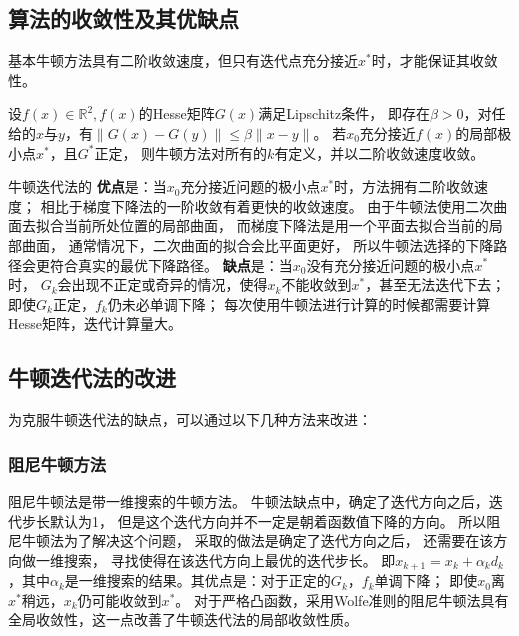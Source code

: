 \subsection{算法的收敛性及其优缺点}
    基本牛顿方法具有二阶收敛速度，但只有迭代点充分接近$x^*$时，才能保证其收敛性。
    
\begin{theorem}\label{thm2_1}
    设$f(x) \in \mathbb{R}^2, f(x)$的Hesse矩阵$G(x)$满足Lipschitz条件，
    即存在$\beta>0$，对任给的$x$与$y$，有$\|G(x)-G(y)\|\leq\beta\|x-y\|$。
    若$x_0$充分接近$f(x)$的局部极小点$x^*$，且$G^*$正定，
    则牛顿方法对所有的$k$有定义，并以二阶收敛速度收敛。
\end{theorem}
    
    牛顿迭代法的
    \textbf{优点}是：当$x_0$充分接近问题的极小点$x^*$时，方法拥有二阶收敛速度；
    相比于梯度下降法的一阶收敛有着更快的收敛速度。
    由于牛顿法使用二次曲面去拟合当前所处位置的局部曲面，
    而梯度下降法是用一个平面去拟合当前的局部曲面，
    通常情况下，二次曲面的拟合会比平面更好，
    所以牛顿法选择的下降路径会更符合真实的最优下降路径。
    \textbf{缺点}是：当$x_0$没有充分接近问题的极小点$x^*$时，
    $G_k$会出现不正定或奇异的情况，使得${x_k}$不能收敛到$x^*$，甚至无法迭代下去；
    即使$G_k$正定，${f_k}$仍未必单调下降；
    每次使用牛顿法进行计算的时候都需要计算Hesse矩阵，迭代计算量大。
    
    
\subsection{牛顿迭代法的改进}
    为克服牛顿迭代法的缺点，可以通过以下几种方法来改进：
    \subsubsection{阻尼牛顿方法}
        阻尼牛顿法是带一维搜索的牛顿方法。
        牛顿法缺点中，确定了迭代方向之后，迭代步长默认为1，
        但是这个迭代方向并不一定是朝着函数值下降的方向。
        所以阻尼牛顿法为了解决这个问题，
        采取的做法是确定了迭代方向之后，
        还需要在该方向做一维搜索，
        寻找使得在该迭代方向上最优的迭代步长。
        即$x_{k+1}=x_k+\alpha_kd_k$，其中$\alpha_k$是一维搜索的结果。其优点是：对于正定的$G_k$，${f_k}$单调下降；
        即使$x_0$离$x^*$稍远，${x_k}$仍可能收敛到$x^*$。
        对于严格凸函数，采用Wolfe准则的阻尼牛顿法具有全局收敛性，这一点改善了牛顿迭代法的局部收敛性质。
        

